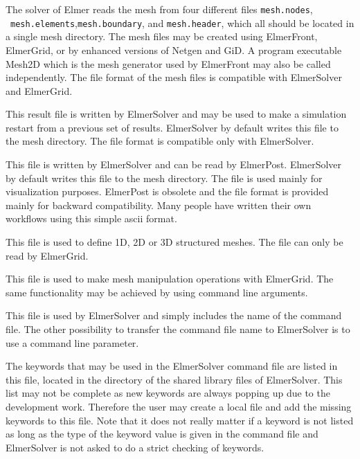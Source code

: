 The solver of Elmer reads the mesh from four different files \texttt{mesh.nodes},
~\texttt{mesh.elements},\linebreak[4] \texttt{mesh.boundary}, and \texttt{mesh.header},
which all should be located in a single mesh directory. The mesh files may be created using 
ElmerFront, ElmerGrid, or by enhanced versions of Netgen and GiD. A program executable
Mesh2D which is the mesh generator used by ElmerFront may also be called independently.
The file format of the mesh files is compatible with ElmerSolver and ElmerGrid.

This result file is written by ElmerSolver and may be used to make a simulation 
restart from a previous set of results. ElmerSolver by default writes this file to 
the mesh directory. The file format is compatible only with ElmerSolver.

This file is written by ElmerSolver and can be read by ElmerPost. 
ElmerSolver by default writes this file to the mesh directory.
The file is used mainly for visualization purposes.
ElmerPost is obsolete and the file format is provided mainly for backward compatibility.
Many people have written their own workflows using this simple ascii format. 

This file is used to define 1D, 2D or 3D structured meshes. 
The file can only be read by ElmerGrid.

This file is used to make mesh manipulation operations with ElmerGrid. The same functionality 
may be achieved by using command line arguments.

This file is used by ElmerSolver and simply includes the name of the command file.
The other possibility to transfer the command file name to ElmerSolver is to use 
a command line parameter.

The keywords that may be used in the ElmerSolver command file are listed in this file, located 
in the directory of the shared library files of ElmerSolver. This list may not be complete as new keywords 
are always popping up due to the development work. Therefore the user may create a local file and 
add the missing keywords to this file. Note that it does not really matter if a keyword is not listed
as long as the type of the keyword value is given in the command file and ElmerSolver is not asked to
do a strict checking of keywords. 

